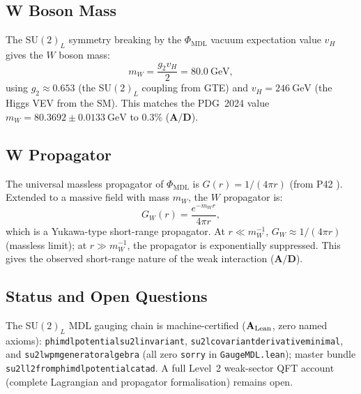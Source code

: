 \documentclass[11pt]{article}
\theoremstyle{remark}
\newcommand{\PHIMDL}{\Phi_{\mathrm{MDL}}}
\newcommand{\lean}[1]{%
  \penalty-100
  \begingroup\def\_{\textunderscore\allowbreak}\texttt{#1}\endgroup}
\newcommand{\CatAL}{\ensuremath{\textbf{A}_{\rm Lean}}}
\newcommand{\CatAD}{\textbf{A/D}}
\begin{document}
\subsection{W Boson Mass}

The SU$(2)_L$ symmetry breaking by the $\PHIMDL$ vacuum expectation value
$v_H$ gives the $W$ boson mass:
\begin{equation}
  m_W = \frac{g_2 v_H}{2} = 80.0\ \text{GeV},
\end{equation}
using $g_2 \approx 0.653$ (the SU$(2)_L$ coupling from GTE) and
$v_H = 246\ \text{GeV}$ (the Higgs VEV from the SM). This matches the
PDG~2024 value $m_W = 80.3692 \pm 0.0133\ \text{GeV}$ to $0.3\%$ ($\CatAD$).

\subsection{W Propagator}

The universal massless propagator of $\PHIMDL$ is $G(r) = 1/(4\pi r)$
(from P42 \cite{SpivackPhiMDLField}). Extended to a massive field with
mass $m_W$, the $W$ propagator is:
\begin{equation}
  G_W(r) = \frac{e^{-m_W r}}{4\pi r},
  \label{eq:w-propagator}
\end{equation}
which is a Yukawa-type short-range propagator. At $r \ll m_W^{-1}$,
$G_W \approx 1/(4\pi r)$ (massless limit); at $r \gg m_W^{-1}$, the
propagator is exponentially suppressed. This gives the observed short-range
nature of the weak interaction ($\CatAD$).

\subsection{Status and Open Questions}

The SU$(2)_L$ MDL gauging chain is machine-certified ($\CatAL$, zero named axioms):
\lean{phimdl\_potential\_su2l\_invariant},
\lean{su2l\_covariant\_derivative\_minimal}, and
\lean{su2l\_wpm\_generator\_algebra} (all zero \texttt{sorry} in
\texttt{GaugeMDL.lean}); master bundle
\lean{su2l\_l2\_from\_phimdl\_potential\_catad}.
A full Level~2 weak-sector QFT account (complete Lagrangian and propagator
formalisation) remains open.
\end{document}
